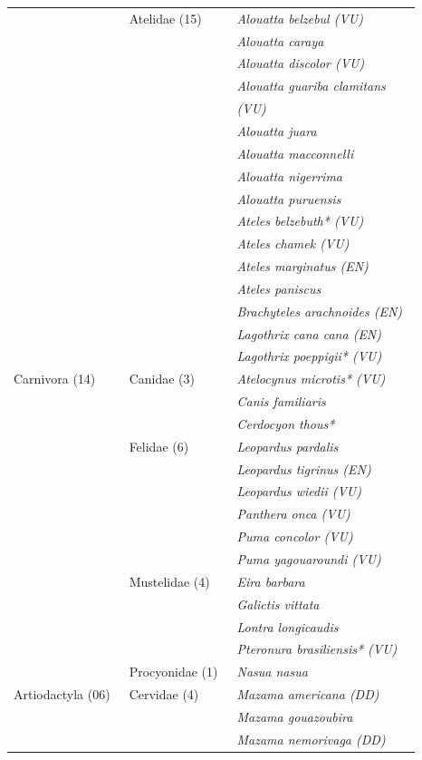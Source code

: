 \documentclass[
  letterpaper,
]{scrbook}
\begin{document}
\begin{longtable}[t]{ll>{}l}
 & Atelidae (15)  & \em{Alouatta belzebul (VU) }\\
\addlinespace
 &  & \em{Alouatta caraya }\\
 &  & \em{Alouatta discolor (VU) }\\
 &  & \em{Alouatta guariba clamitans }\\
 &  & \em{(VU) }\\
 &  & \em{Alouatta juara }\\
\addlinespace
 &  & \em{Alouatta macconnelli }\\
 &  & \em{Alouatta nigerrima }\\
 &  & \em{Alouatta puruensis }\\
 &  & \em{Ateles belzebuth* (VU) }\\
 &  & \em{Ateles chamek (VU) }\\
\addlinespace
 &  & \em{Ateles marginatus (EN) }\\
 &  & \em{Ateles paniscus }\\
 &  & \em{Brachyteles arachnoides (EN) }\\
 &  & \em{Lagothrix cana cana (EN) }\\
 &  & \em{Lagothrix poeppigii* (VU) }\\
\addlinespace
Carnivora (14)  & Canidae (3)  & \em{Atelocynus microtis* (VU) }\\
 &  & \em{Canis familiaris }\\
 &  & \em{Cerdocyon thous* }\\
 & Felidae (6)  & \em{Leopardus pardalis }\\
 &  & \em{Leopardus tigrinus (EN) }\\
\addlinespace
 &  & \em{Leopardus wiedii (VU) }\\
 &  & \em{Panthera onca (VU) }\\
 &  & \em{Puma concolor (VU) }\\
 &  & \em{Puma yagouaroundi (VU) }\\
 & Mustelidae (4)  & \em{Eira barbara }\\
\addlinespace
 &  & \em{Galictis vittata }\\
 &  & \em{Lontra longicaudis }\\
 &  & \em{Pteronura brasiliensis* (VU) }\\
 & Procyonidae (1)  & \em{Nasua nasua }\\
Artiodactyla (06)  & Cervidae (4)  & \em{Mazama americana (DD) }\\
\addlinespace
 &  & \em{Mazama gouazoubira }\\
 &  & \em{Mazama nemorivaga (DD) }\\

\end{longtable}
\end{document}
